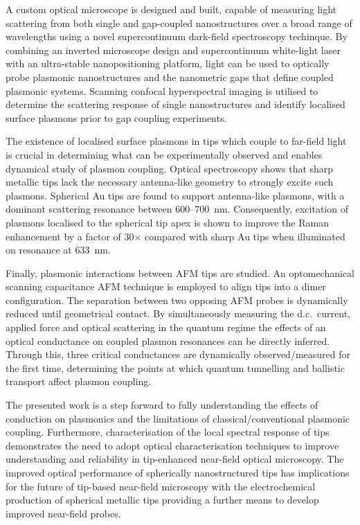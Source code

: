 \documentclass[12pt, a4paper, oneside]{book}
\begin{document}
\begin{singlespace}
A custom optical microscope is designed and built, capable of measuring light scattering from both single and gap-coupled nanostructures over a broad range of wavelengths using a novel supercontinuum dark-field spectroscopy techinque. By combining an inverted microscope design and supercontinuum white-light laser with an ultra-stable nanopositioning platform, light can be used to optically probe plasmonic nanostructures and the nanometric gaps that define coupled plasmonic systems. Scanning confocal hyperspectral imaging is utilised to determine the scattering response of single nanostructures and identify localised surface plasmons prior to gap coupling experiments.

The existence of localised surface plasmons in tips which couple to far-field light is crucial in determining what can be experimentally observed and enables dynamical study of plasmon coupling. Optical spectroscopy shows that sharp metallic tips lack the necessary antenna-like geometry to strongly excite such plasmons. Spherical Au tips are found to support antenna-like plasmons, with a dominant scattering resonance between 600--\SI{700}{nm}. Consequently, excitation of plasmons localised to the spherical tip apex is shown to improve the Raman enhancement by a factor of 30$\times$ compared with sharp Au tips when illuminated on resonance at \SI{633}{nm}.

Finally, plasmonic interactions between AFM tips are studied. An optomechanical scanning capacitance AFM technique is employed to align tips into a dimer configuration. The separation between two opposing AFM probes is dynamically reduced until geometrical contact. By simultaneously measuring the d.c.\ current, applied force and optical scattering in the quantum regime the effects of an optical conductance on coupled plasmon resonances can be directly inferred. Through this, three critical conductances are dynamically observed/measured for the first time, determining the points at which quantum tunnelling and ballistic transport affect plasmon coupling.

The presented work is a step forward to fully understanding the effects of conduction on plasmonics and the limitations of classical/conventional plasmonic coupling. Furthermore, characterisation of the local spectral response of tips demonstrates the need to adopt optical characterisation techniques to improve understanding and reliability in tip-enhanced near-field optical microscopy. The improved optical performance of spherically nanostructured tips has implications for the future of tip-based near-field microscopy with the electrochemical production of spherical metallic tips providing a further means to develop improved near-field probes.
\end{singlespace}
\end{document}
